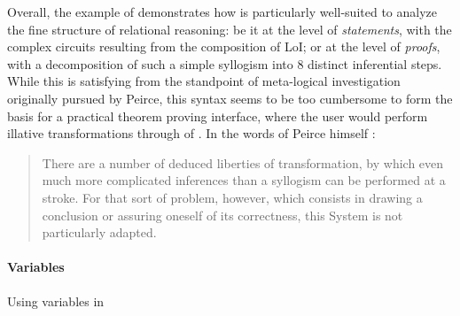 \begin{scope}
\begin{scope}
Overall, the example of  demonstrates how 
is particularly well-suited to analyze the fine structure of relational
reasoning: be it at the level of \emph{statements}, with the complex circuits
resulting from the composition of LoI; or at the level of \emph{proofs}, with a
decomposition of such a simple syllogism into 8 distinct inferential steps.
While this is satisfying from the standpoint of meta-logical investigation
originally pursued by Peirce, this syntax seems to be too cumbersome to form the
basis for a practical theorem proving interface, where the user would perform
illative transformations through  of . In the words of
Peirce himself \cite[p.~544]{peirce_prolegomena_1906}:
\begin{quote}
  There are a number of deduced liberties of transformation, by which even much
  more complicated inferences than a syllogism can be performed at a stroke. For
  that sort of problem, however, which consists in drawing a conclusion or
  assuring oneself of its correctness, this System is not particularly adapted.
\end{quote}

\paragraph{Variables}

\begin{marginfigure}
  \hspace{-3em}
  \caption{Using variables in }
\end{marginfigure}


\end{scope}
\end{scope}
